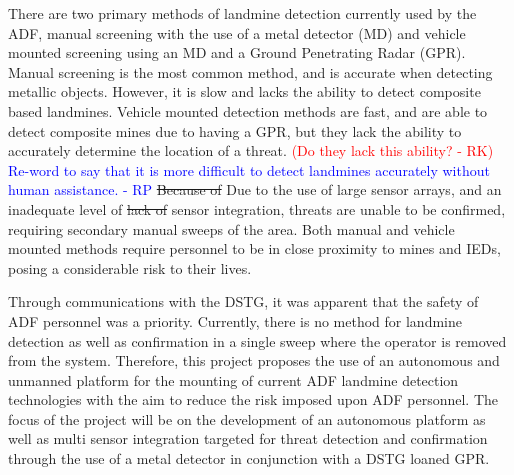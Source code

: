 \documentclass[main.tex]{subfiles}
\begin{document}
There are two primary methods of landmine detection currently used by the ADF, manual screening with the use of a metal detector (MD) and vehicle mounted screening using an MD and a Ground Penetrating Radar (GPR). Manual screening is the most common method, and is accurate when detecting metallic objects. However, it is slow and lacks the ability to detect composite based landmines. Vehicle mounted detection methods are fast, and are able to detect composite mines due to having a GPR, but they lack the ability to accurately determine the location of a threat. 
\textcolor{red}{(Do they lack this ability? - RK)} \textcolor{blue}{Re-word to say that it is more difficult to detect landmines accurately without human assistance. - RP}
\sout{Because of} Due to the use of large sensor arrays, and an inadequate level of \sout{lack of} sensor integration, threats are unable to be confirmed, requiring secondary manual sweeps of the area. Both manual and vehicle mounted methods require personnel to be in close proximity to mines and IEDs, posing a considerable risk to their lives. %
\\
%
%

Through communications with the DSTG, it was apparent that the safety of ADF personnel  was a priority. Currently, there is no method for landmine detection as well as confirmation in a single sweep where the operator is removed from the system. Therefore, this project proposes the use of an autonomous and unmanned platform for the mounting of current ADF landmine detection technologies with the aim to reduce the risk imposed upon ADF personnel. The focus of the project will be on the development of an autonomous platform as well as multi sensor integration targeted for threat detection and confirmation through the use of a metal detector in conjunction with a DSTG loaned GPR.
\\

\end{document}
